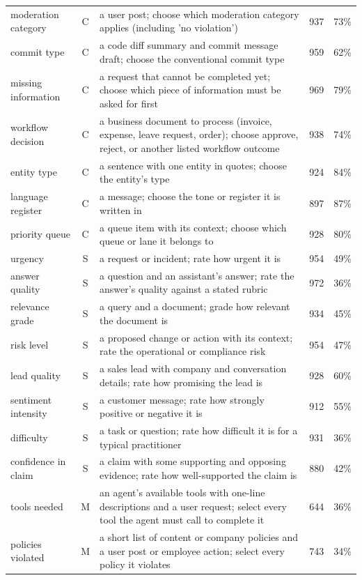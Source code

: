 \begin{longtable}{@{}lc>{\raggedright\arraybackslash}p{8.4cm}rr@{}}
moderation category & C & a user post; choose which moderation category applies (including 'no violation') & 937 & 73\% \\
commit type & C & a code diff summary and commit message draft; choose the conventional commit type & 959 & 62\% \\
missing information & C & a request that cannot be completed yet; choose which piece of information must be asked for first & 969 & 79\% \\
workflow decision & C & a business document to process (invoice, expense, leave request, order); choose approve, reject, or another listed workflow outcome & 938 & 74\% \\
entity type & C & a sentence with one entity in quotes; choose the entity's type & 924 & 84\% \\
language register & C & a message; choose the tone or register it is written in & 897 & 87\% \\
priority queue & C & a queue item with its context; choose which queue or lane it belongs to & 928 & 80\% \\
urgency & S & a request or incident; rate how urgent it is & 954 & 49\% \\
answer quality & S & a question and an assistant's answer; rate the answer's quality against a stated rubric & 972 & 36\% \\
relevance grade & S & a query and a document; grade how relevant the document is & 934 & 45\% \\
risk level & S & a proposed change or action with its context; rate the operational or compliance risk & 954 & 47\% \\
lead quality & S & a sales lead with company and conversation details; rate how promising the lead is & 928 & 60\% \\
sentiment intensity & S & a customer message; rate how strongly positive or negative it is & 912 & 55\% \\
difficulty & S & a task or question; rate how difficult it is for a typical practitioner & 931 & 36\% \\
confidence in claim & S & a claim with some supporting and opposing evidence; rate how well-supported the claim is & 880 & 42\% \\
tools needed & M & an agent's available tools with one-line descriptions and a user request; select every tool the agent must call to complete it & 644 & 36\% \\
policies violated & M & a short list of content or company policies and a user post or employee action; select every policy it violates & 743 & 34\% \\

\end{longtable}
